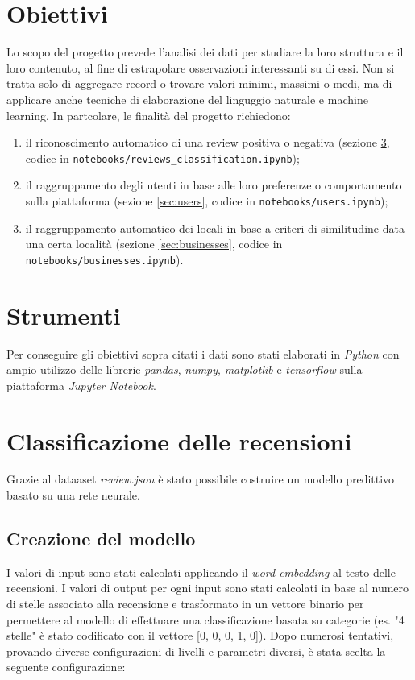 \documentclass[12pt]{article}
\begin{document}
\section{Obiettivi}
Lo scopo del progetto prevede l'analisi dei dati per studiare la loro struttura e il loro contenuto, al fine di estrapolare osservazioni interessanti su di essi. Non si tratta solo di aggregare record o trovare valori minimi, massimi o medi, ma di applicare anche tecniche di elaborazione del linguggio naturale e machine learning. In partcolare, le finalità del progetto richiedono:
\begin{enumerate}[label=T\arabic*)]
\item il riconoscimento automatico di una review positiva o negativa (sezione \ref{sec:reviews}, codice in \texttt{notebooks/reviews\_classification.ipynb});
\item il raggruppamento degli utenti in base alle loro preferenze o comportamento sulla piattaforma (sezione \ref{sec:users}, codice in \texttt{notebooks/users.ipynb});
\item il raggruppamento automatico dei locali in base a criteri di similitudine data una certa località (sezione \ref{sec:businesses}, codice in \texttt{notebooks/businesses.ipynb}).
\end{enumerate}

\section{Strumenti}
Per conseguire gli obiettivi sopra citati i dati sono stati elaborati in \textit{Python} con ampio utilizzo delle librerie \textit{pandas}, \textit{numpy}, \textit{matplotlib} e \textit{tensorflow} sulla piattaforma \textit{Jupyter Notebook}.

\section{Classificazione delle recensioni}
\label{sec:reviews}
Grazie al dataaset \textit{review.json} è stato possibile costruire un modello predittivo basato su una rete neurale.

\subsection{Creazione del modello}
I valori di input sono stati calcolati applicando il \textit{word embedding} al testo delle recensioni. I valori di output per ogni input sono stati calcolati in base al numero di stelle associato alla recensione e trasformato in un vettore binario per permettere al modello di effettuare una classificazione basata su categorie (es. "4 stelle" è stato codificato con il vettore [0, 0, 0, 1, 0]). \newline
Dopo numerosi tentativi, provando diverse configurazioni di livelli e parametri diversi, è stata scelta la seguente configurazione:

\end{document}
